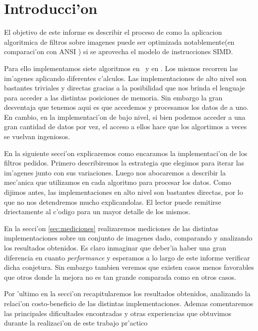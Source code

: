 \section{Introducci'on}

El objetivo de este informe es describir el proceso de como la aplicacion algoritmica de filtros sobre imagenes
puede ser optimizada notablemente(en comparaci'on con ANSI \C) si se aprovecha el modelo de instrucciones SIMD. 

Para ello implementamos siete algoritmos en \C\ y en \ass. Los mismos recorren las im'agenes aplicando diferentes c'alculos. Las implementaciones de alto nivel son bastantes triviales y directas gracias a la posibilidad que nos brinda el lenguaje para acceder a las distintas posiciones de memoria. Sin embargo la gran desventaja que tenemos aqui es que accedemos y procesamos los datos de a uno. En cambio, en la implementaci'on de bajo nivel, si bien podemos acceder a una gran cantidad de datos por vez, el acceso a ellos hace que los algortimos a veces se vuelvan ingeniosos. 

En la siguiente secci'on explicaremos como encaramos la implementaci'on de los filtros pedidos. Primero describiremos la estrategia que elegimos para iterar las im'agenes junto con sus variaciones. Luego nos abocaremos a describir la mec'anica que utilizamos en cada algoritmo para procesar los datos. Como dijimos antes, las implementaciones en alto nivel son bastantes directas, por lo que no nos detendremos mucho explicandolas. El lector puede remitirse driectamente al c'odigo para un mayor detalle de los mismos.

En la secci'on \ref{sec:mediciones} realizaremos mediciones de las distintas implementaciones sobre un conjunto de imagenes dado, comparando y analizando los resultados obtenidos. Es claro inmaginar que deber'ia haber una  gran diferencia en cuanto \textit{performance} y esperamos a lo largo de este informe verificar dicha conjetura. Sin embargo tambien veremos que existen casos menos favorables que otros donde la mejora no es tan grande comparada como en otros casos. 

Por 'ultimo en la secci'on \label{sec:conclusiones} recapitularemos los resultados obtenidos, analizando la relaci'on costo-beneficio de las distintas implementaciones. Ademas comentaremos las principales dificultades encontradas y otras experiencias que obtuvimos durante la realizaci'on de este trabajo pr'actico

